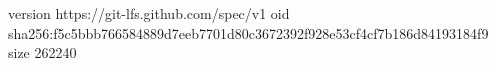 version https://git-lfs.github.com/spec/v1
oid sha256:f5c5bbb766584889d7eeb7701d80c3672392f928e53cf4cf7b186d84193184f9
size 262240
